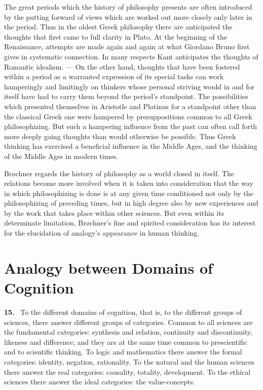 \documentclass[12pt]{book}
\newcommand{\hnum}[1]{\noindent\textbf{#1.}~}
\newcommand{\opage}[1]{\marginnote{\footnotesize\textit{[#1]}}}
\begin{document}
The great periods which the history of philosophy presents are often introduced
by the putting forward of views which are worked out more closely only later in
the period. Thus \opage{79}in the oldest Greek philosophy there are anticipated the
thoughts that first came to full clarity in Plato. At the beginning of the
Renaissance, attempts are made again and again at what Giordano Bruno first gives
in systematic connection. In many respects Kant anticipates the thoughts of
Romantic idealism. --- On the other hand, thoughts that have been fostered within
a period as a warranted expression of its special tasks can work hamperingly and
limitingly on thinkers whose personal striving would in and for itself have had
to carry them beyond the period's standpoint. The possibilities which presented
themselves in Aristotle and Plotinus for a standpoint other than the classical
Greek one were hampered by presuppositions common to all Greek philosophizing.
But such a hampering influence from the past can often call forth more deeply
going thoughts than would otherwise be possible. Thus Greek thinking has
exercised a beneficial influence in the Middle Ages, and the thinking of the
Middle Ages in modern times.

Brøchner regards the history of philosophy as a world closed in itself. The
relations become more involved when it is taken into consideration that the way
in which philosophizing is done is at any given time conditioned not only by the
philosophizing of preceding times, but in high degree also by new experiences and
by the work that takes place within other sciences. But even within its
determinate limitation, Brøchner's fine and spirited consideration has its
interest for the elucidation of analogy's appearance in human thinking.



\chapter{Analogy between Domains of Cognition}
\label{ch:4}

\hnum{15} To the different domains of cognition, that is, to the different groups
of sciences, there answer different \opage{80}groups of categories. Common to all sciences
are the fundamental categories: synthesis and relation, continuity and
discontinuity, likeness and difference; and they are at the same time common to
prescientific and to scientific thinking. To logic and mathematics there answer
the formal categories: identity, negation, rationality. To the natural and the
human sciences there answer the real categories: causality, totality,
development. To the ethical sciences there answer the ideal categories: the
value-concepts.
\end{document}
